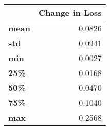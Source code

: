\begin{tabular}{lr}
\toprule
{} &  Change in Loss \\
\midrule
\textbf{mean} &          0.0826 \\
\textbf{std } &          0.0941 \\
\textbf{min } &          0.0027 \\
\textbf{25\% } &          0.0168 \\
\textbf{50\% } &          0.0470 \\
\textbf{75\% } &          0.1040 \\
\textbf{max } &          0.2568 \\
\bottomrule
\end{tabular}
